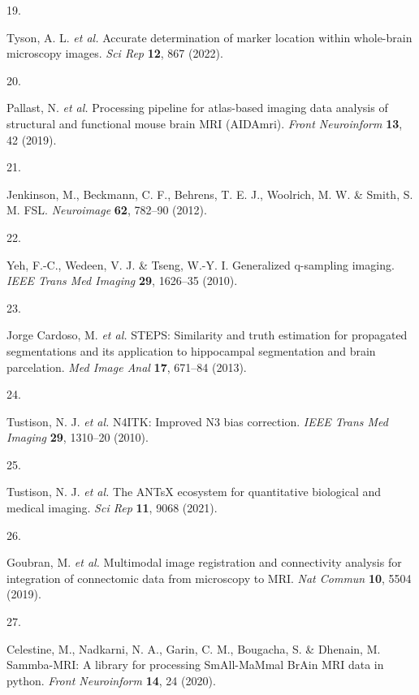 \documentclass[
  12pt,
]{article}
\newlength{\cslhangindent}
\newlength{\csllabelwidth}
\newenvironment{CSLReferences}[2] %
 {%
  \setlength{\parindent}{0pt}
  \ifodd #1 \everypar{\setlength{\hangindent}{\cslhangindent}}\ignorespaces\fi
  \ifnum #2 > 0
  \setlength{\parskip}{#2\baselineskip}
  \fi
 }%
 {}
\newcommand{\CSLLeftMargin}[1]{\parbox[t]{\csllabelwidth}{#1}}
\newcommand{\CSLRightInline}[1]{\parbox[t]{\linewidth - \csllabelwidth}{#1}\break}
\begin{document}
\begin{CSLReferences}{0}{0}
\leavevmode{}%
\CSLLeftMargin{19. }
\CSLRightInline{Tyson, A. L. \emph{et al.} Accurate determination of
marker location within whole-brain microscopy images. \emph{Sci Rep}
\textbf{12}, 867 (2022).}

\leavevmode{}%
\CSLLeftMargin{20. }
\CSLRightInline{Pallast, N. \emph{et al.} Processing pipeline for
atlas-based imaging data analysis of structural and functional mouse
brain MRI (AIDAmri). \emph{Front Neuroinform} \textbf{13}, 42 (2019).}

\leavevmode{}%
\CSLLeftMargin{21. }
\CSLRightInline{Jenkinson, M., Beckmann, C. F., Behrens, T. E. J.,
Woolrich, M. W. \& Smith, S. M. FSL. \emph{Neuroimage} \textbf{62},
782--90 (2012).}

\leavevmode{}%
\CSLLeftMargin{22. }
\CSLRightInline{Yeh, F.-C., Wedeen, V. J. \& Tseng, W.-Y. I. Generalized
q-sampling imaging. \emph{IEEE Trans Med Imaging} \textbf{29}, 1626--35
(2010).}

\leavevmode{}%
\CSLLeftMargin{23. }
\CSLRightInline{Jorge Cardoso, M. \emph{et al.} STEPS: Similarity and
truth estimation for propagated segmentations and its application to
hippocampal segmentation and brain parcelation. \emph{Med Image Anal}
\textbf{17}, 671--84 (2013).}

\leavevmode{}%
\CSLLeftMargin{24. }
\CSLRightInline{Tustison, N. J. \emph{et al.} {N4ITK}: Improved {N3}
bias correction. \emph{IEEE Trans Med Imaging} \textbf{29}, 1310--20
(2010).}

\leavevmode{}%
\CSLLeftMargin{25. }
\CSLRightInline{Tustison, N. J. \emph{et al.} The ANTsX ecosystem for
quantitative biological and medical imaging. \emph{Sci Rep} \textbf{11},
9068 (2021).}

\leavevmode{}%
\CSLLeftMargin{26. }
\CSLRightInline{Goubran, M. \emph{et al.} Multimodal image registration
and connectivity analysis for integration of connectomic data from
microscopy to MRI. \emph{Nat Commun} \textbf{10}, 5504 (2019).}

\leavevmode{}%
\CSLLeftMargin{27. }
\CSLRightInline{Celestine, M., Nadkarni, N. A., Garin, C. M., Bougacha,
S. \& Dhenain, M. Sammba-MRI: A library for processing SmAll-MaMmal
BrAin MRI data in python. \emph{Front Neuroinform} \textbf{14}, 24
(2020).}


\end{CSLReferences}
\end{document}
